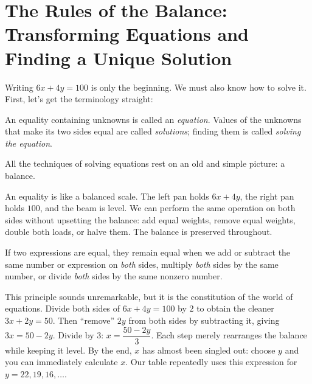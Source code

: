 \section{The Rules of the Balance: Transforming Equations and Finding a Unique Solution}

Writing $6x+4y=100$ is only the beginning. We must also know how to solve it. First, let's get the terminology straight:

\begin{dingyi}[Equation]
An equality containing unknowns is called an \emph{equation}. Values of the unknowns that make its two sides equal are called \emph{solutions}; finding them is called \emph{solving the equation}.
\end{dingyi}

All the techniques of solving equations rest on an old and simple picture: a balance.

An equality is like a balanced scale. The left pan holds $6x+4y$, the right pan holds $100$, and the beam is level. We can perform the same operation on both sides without upsetting the balance: add equal weights, remove equal weights, double both loads, or halve them. The balance is preserved throughout.

\begin{center}
\end{center}

\begin{dingli}
If two expressions are equal, they remain equal when we add or subtract the same number or expression on \emph{both} sides, multiply \emph{both} sides by the same number, or divide \emph{both} sides by the same nonzero number.
\end{dingli}

This principle sounds unremarkable, but it is the constitution of the world of equations. Divide both sides of $6x+4y=100$ by $2$ to obtain the cleaner $3x+2y=50$. Then ``remove'' $2y$ from both sides by subtracting it, giving $3x=50-2y$. Divide by $3$: $x=\dfrac{50-2y}{3}$. Each step merely rearranges the balance while keeping it level. By the end, $x$ has almost been singled out: choose $y$ and you can immediately calculate $x$. Our table repeatedly uses this expression for $y=22,19,16,\dots$.

